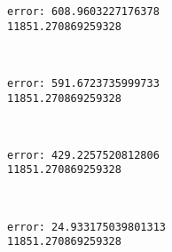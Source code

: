 \documentclass[11pt]{article}
\begin{document}
    \begin{Verbatim}[commandchars=\\\{\}]
error: 608.9603227176378
11851.270869259328

    \end{Verbatim}

    \begin{center}
    \end{center}
    { \hspace*{\fill} \\}
    
    \begin{Verbatim}[commandchars=\\\{\}]
error: 591.6723735999733
11851.270869259328

    \end{Verbatim}

    \begin{center}
    \end{center}
    { \hspace*{\fill} \\}
    
    \begin{Verbatim}[commandchars=\\\{\}]
error: 429.2257520812806
11851.270869259328

    \end{Verbatim}

    \begin{center}
    \end{center}
    { \hspace*{\fill} \\}
    
    \begin{Verbatim}[commandchars=\\\{\}]
error: 24.933175039801313
11851.270869259328

    \end{Verbatim}

    \begin{center}
    \end{center}
    { \hspace*{\fill} \\}
    
\end{document}
